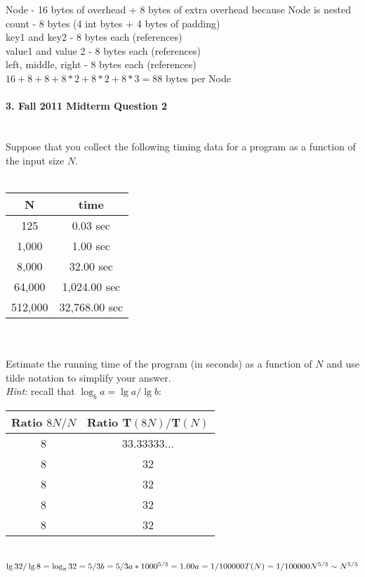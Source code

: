 \documentclass{article}
\begin{document}
Node - 16 bytes of overhead + 8 bytes of extra overhead because Node is nested\\
count - 8 bytes (4 int bytes + 4 bytes of padding)\\
key1 and key2 - 8 bytes each (references)\\
value1 and value 2 - 8 bytes each (references)\\
left, middle, right - 8 bytes each (references)\\

$16 + 8 + 8 + 8*2 + 8*2 + 8*3 = 88$ bytes per Node\\

\paragraph{\Large 3. Fall 2011 Midterm Question 2}\mbox{}\\
Suppose that you collect the following timing data for a program as a function of the input
size $N$.\\\\
\begin{tabular}{c | c}
N & time \\ \hline
125 & 0.03 sec \\
1,000 & 1.00 sec \\
8,000 & 32.00 sec \\
64,000 & 1,024.00 sec \\
512,000 & 32,768.00 sec
\end{tabular}\\\\
Estimate the running time of the program (in seconds) as a function of $N$ and use tilde
notation to simplify your answer.\\
\textit{Hint}: recall that $\log_b a = \lg a / \lg b$:\\

\begin{tabular}{c | c}
Ratio $8N/N$ & Ratio T$(8N)/$T$(N)$ \\ \hline
8 & 33.33333... \\
8 & 32 \\
8 & 32 \\
8 & 32 \\
8 & 32 \\
\end{tabular}\\

\noindent $\lg 32/\lg 8 = \log_8 32 = 5/3 \\
b = 5/3 \\
a*1000^{5/3}=1.00\\
a=1/100000
T(N) = 1/100000N^{5/3} \sim N^{5/3}$
\end{document}
